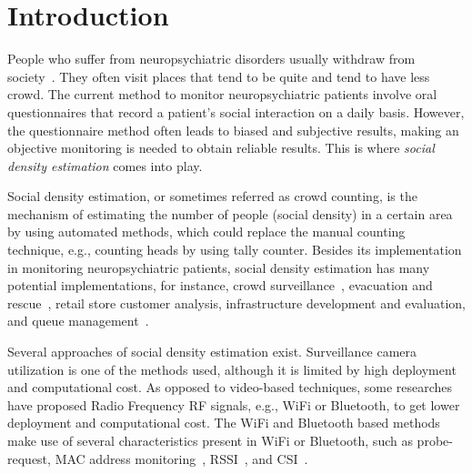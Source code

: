 \chapter{Introduction}\label{ch:introduction}

People who suffer from neuropsychiatric disorders usually withdraw from society~\cite{thesis084,thesis083}. They often visit places that tend to be quite and tend to have less crowd. The current method to monitor neuropsychiatric patients involve oral questionnaires that record a patient's social interaction on a daily basis. However, the questionnaire method often leads to biased and subjective results, making an objective monitoring is needed to obtain reliable results.
This is where \textit{social density estimation} comes into play.

Social density estimation, or sometimes referred as crowd counting, is the mechanism of estimating the number of people (social density) in a certain area by using automated methods, which could replace the manual counting technique, e.g., counting heads by using tally counter. Besides its implementation in monitoring neuropsychiatric patients, social density estimation has many potential implementations, for instance, crowd surveillance~\cite{thesis050}, evacuation and rescue~\cite{thesis045}, retail store customer analysis, infrastructure development and evaluation, and queue management~\cite{thesis012}.

Several approaches of social density estimation exist. Surveillance camera utilization is one of the methods used, although it is limited by high deployment and computational cost. As opposed to video-based techniques, some researches have proposed Radio Frequency RF signals, e.g., WiFi or Bluetooth, to get lower deployment and computational cost. The WiFi and Bluetooth based methods make use of several characteristics present in WiFi or Bluetooth, such as probe-request, \ac{MAC} address monitoring~\cite{thesis008}, \ac{RSSI}~\cite{thesis046}, and \ac{CSI}~\cite{thesis051}. 

